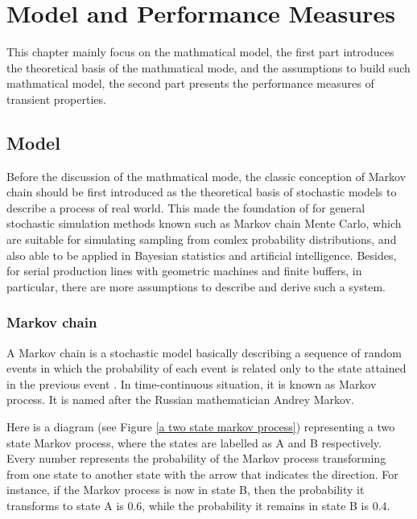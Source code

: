 \chapter{Model and Performance Measures}
\label{B_Kapitel}
\noindent This chapter mainly focus on the mathmatical model, the first part introduces the theoretical basis of the mathmatical mode, and the assumptions to build such mathmatical model, the second part presents the performance measures of transient properties.

\section{Model}
\noindent Before the discussion of the mathmatical mode, the classic conception of Markov chain should be first introduced as the theoretical basis of stochastic models to describe a process of real world. This made the foundation of for general stochastic simulation methods known such as Markov chain Mente Carlo, which are suitable for simulating sampling from comlex probability distributions, and also able to be applied in Bayesian statistics and artificial intelligence. Besides, for serial production lines with geometric machines and finite buffers, in particular, there are more assumptions to describe and derive such a system.

\subsection{Markov chain}
\noindent A Markov chain is a stochastic model basically describing a sequence of random events in which the probability of each event is related only to the state attained in the previous event \cite{gagniuc2017markov}. In time-continuous situation, it is known as Markov process. It is named after the Russian mathematician Andrey Markov. 

Here is a diagram (see Figure \ref{a two state markov process}) representing a two state Markov process, where the states are labelled as A and B respectively. Every number represents the probability of the Markov process transforming from one state to another state with the arrow that indicates the direction. For instance, if the Markov process is now in state B, then the probability it transforms to state A is 0.6, while the probability it remains in state B is 0.4.

